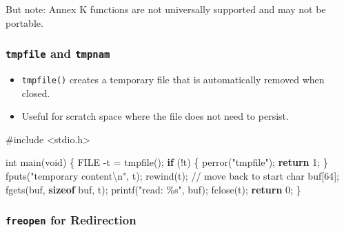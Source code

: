 \documentclass[
  letterpaper,
  DIV=11,
  numbers=noendperiod]{scrreprt}
\newenvironment{Shaded}{\begin{snugshade}}{\end{snugshade}}
\newcommand{\CommentTok}[1]{\textcolor[rgb]{0.37,0.37,0.37}{#1}}
\newcommand{\ControlFlowTok}[1]{\textcolor[rgb]{0.00,0.23,0.31}{\textbf{#1}}}
\newcommand{\DataTypeTok}[1]{\textcolor[rgb]{0.68,0.00,0.00}{#1}}
\newcommand{\DecValTok}[1]{\textcolor[rgb]{0.68,0.00,0.00}{#1}}
\newcommand{\ImportTok}[1]{\textcolor[rgb]{0.00,0.46,0.62}{#1}}
\newcommand{\KeywordTok}[1]{\textcolor[rgb]{0.00,0.23,0.31}{\textbf{#1}}}
\newcommand{\NormalTok}[1]{\textcolor[rgb]{0.00,0.23,0.31}{#1}}
\newcommand{\OperatorTok}[1]{\textcolor[rgb]{0.37,0.37,0.37}{#1}}
\newcommand{\PreprocessorTok}[1]{\textcolor[rgb]{0.68,0.00,0.00}{#1}}
\newcommand{\SpecialCharTok}[1]{\textcolor[rgb]{0.37,0.37,0.37}{#1}}
\newcommand{\StringTok}[1]{\textcolor[rgb]{0.13,0.47,0.30}{#1}}
\providecommand{\tightlist}{%
  \setlength{\itemsep}{0pt}\setlength{\parskip}{0pt}}
\begin{document}
But note: Annex K functions are not universally supported and may not be
portable.

\subsubsection{\texorpdfstring{\texttt{tmpfile} and
\texttt{tmpnam}}{tmpfile and tmpnam}}\label{tmpfile-and-tmpnam}

\begin{itemize}
\tightlist
\item
  \texttt{tmpfile()} creates a temporary file that is automatically
  removed when closed.
\item
  Useful for scratch space where the file does not need to persist.
\end{itemize}

\begin{Shaded}
\begin{Highlighting}[]
\PreprocessorTok{\#include }\ImportTok{\textless{}stdio.h\textgreater{}}

\DataTypeTok{int}\NormalTok{ main}\OperatorTok{(}\DataTypeTok{void}\OperatorTok{)} \OperatorTok{\{}
    \DataTypeTok{FILE} \OperatorTok{{-}}\NormalTok{t }\OperatorTok{=}\NormalTok{ tmpfile}\OperatorTok{();}
    \ControlFlowTok{if} \OperatorTok{(!}\NormalTok{t}\OperatorTok{)} \OperatorTok{\{}\NormalTok{ perror}\OperatorTok{(}\StringTok{"tmpfile"}\OperatorTok{);} \ControlFlowTok{return} \DecValTok{1}\OperatorTok{;} \OperatorTok{\}}
\NormalTok{    fputs}\OperatorTok{(}\StringTok{"temporary content}\SpecialCharTok{\textbackslash{}n}\StringTok{"}\OperatorTok{,}\NormalTok{ t}\OperatorTok{);}
\NormalTok{    rewind}\OperatorTok{(}\NormalTok{t}\OperatorTok{);}  \CommentTok{// move back to start}
    \DataTypeTok{char}\NormalTok{ buf}\OperatorTok{[}\DecValTok{64}\OperatorTok{];}
\NormalTok{    fgets}\OperatorTok{(}\NormalTok{buf}\OperatorTok{,} \KeywordTok{sizeof}\NormalTok{ buf}\OperatorTok{,}\NormalTok{ t}\OperatorTok{);}
\NormalTok{    printf}\OperatorTok{(}\StringTok{"read: }\SpecialCharTok{\%s}\StringTok{"}\OperatorTok{,}\NormalTok{ buf}\OperatorTok{);}
\NormalTok{    fclose}\OperatorTok{(}\NormalTok{t}\OperatorTok{);}
    \ControlFlowTok{return} \DecValTok{0}\OperatorTok{;}
\OperatorTok{\}}
\end{Highlighting}
\end{Shaded}

\subsubsection{\texorpdfstring{\texttt{freopen} for
Redirection}{freopen for Redirection}}\label{freopen-for-redirection}
\end{document}
